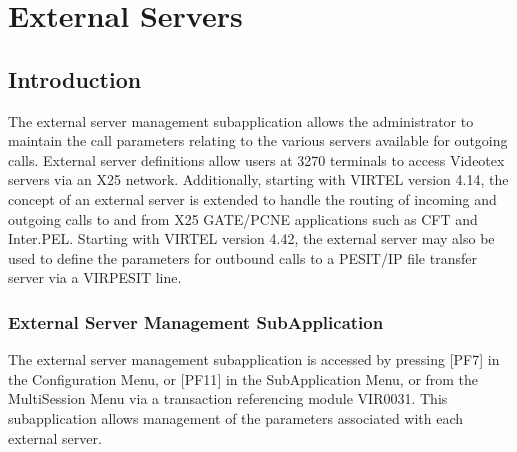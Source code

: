 \documentclass[letterpaper,10pt,english]{sphinxmanual}
\begin{document}
\ignorespaces 

\chapter{External Servers}
\label{\detokenize{connectivity_guide:external-servers}}\label{\detokenize{connectivity_guide:index-132}}

\section{Introduction}
\label{\detokenize{connectivity_guide:id68}}
\sphinxAtStartPar
The external server management sub\sphinxhyphen{}application allows the administrator to maintain the call parameters relating to the various servers available for outgoing calls. External server definitions allow users at 3270 terminals to access Videotex servers via an X25 network. Additionally, starting with VIRTEL version 4.14, the concept of an external server
is extended to handle the routing of incoming and outgoing calls to and from X25 GATE/PCNE applications such as CFT and Inter.PEL. Starting with VIRTEL version 4.42, the external server may also be used to define the parameters for outbound calls to a PESIT/IP file transfer server via a VIRPESIT line.

\ignorespaces 

\subsection{External Server Management Sub\sphinxhyphen{}Application}
\label{\detokenize{connectivity_guide:external-server-management-sub-application}}\label{\detokenize{connectivity_guide:index-133}}
\sphinxAtStartPar
The external server management sub\sphinxhyphen{}application is accessed by pressing {[}PF7{]} in the Configuration Menu, or {[}PF11{]} in the Sub\sphinxhyphen{}Application Menu, or from the Multi\sphinxhyphen{}Session Menu via a transaction referencing module VIR0031. This subapplication allows management of the parameters associated with each external server.

\ignorespaces 
\end{document}
